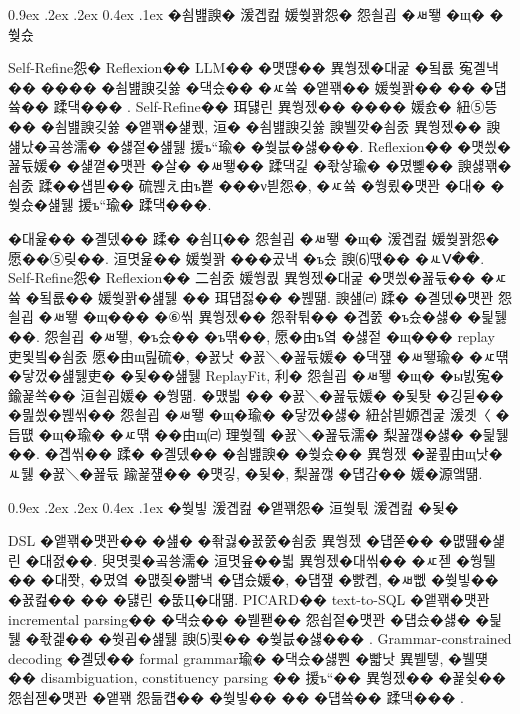 \documentclass[10pt,twocolumn]{article}
\makeatletter
\renewcommand{\subsection}{\@startsection{subsection}{2}{\z@}%
{0.9ex \@plus .2ex \@minus .2ex}%
{0.4ex \@plus .1ex}%
{\normalfont\normalsize\bfseries}}
\makeatother
\begin{document}
\subsection{�쇰뱶諛� 湲곕컲 媛쒖꽑怨� 怨쇨굅 �ㅽ뙣 �щ� �쒖슜}

Self-Refine怨� Reflexion�� LLM�� �먯떊�� 異쒕젰�대굹 �됰룞 寃곌낵�� ���� �쇰뱶諛깆쓣 �댁슜�� �ㅼ쓬 �앹꽦�� 媛쒖꽑�� �� �덉쓬�� 蹂댁��� \cite{REF_SELFREFINE,REF_REFLEXION}. Self-Refine�� 珥덇린 異쒕젰�� ���� 媛숈� 紐⑤뜽�� �쇰뱶諛깆쓣 �앹꽦�섍퀬, 洹� �쇰뱶諛깆쓣 諛뷀깢�쇰줈 異쒕젰�� 諛섎났�곸쑝濡� �섏젙�섎뒗 援ъ“瑜� �쒖븞�섏���. Reflexion�� �먯씠�꾪듃媛� �섍꼍�먯꽌 �살� �ㅽ뙣�� 蹂댁긽 �좏샇瑜� �몄뼱�� 諛섏꽦�쇰줈 蹂��섑븯�� 硫붾え由ъ뿉 ���ν븯怨�, �ㅼ쓬 �쒕룄�먯꽌 �대� �쒖슜�섎뒗 援ъ“瑜� 蹂댁���.

�대윭�� �곌뎄�� 蹂� �쇰Ц�� 怨쇨굅 �ㅽ뙣 �щ� 湲곕컲 媛쒖꽑怨� 愿��⑤맂��. 洹몃윭�� 媛쒖꽑 ���곴낵 �ъ슜 諛⑹떇�� �ㅻⅤ��. Self-Refine怨� Reflexion�� 二쇰줈 媛쒕퀎 異쒕젰�대굹 �먯씠�꾪듃�� �ㅼ쓬 �됰룞�� 媛쒖꽑�섎뒗 �� 珥덉젏�� �붾떎. 諛섎㈃ 蹂� �곌뎄�먯꽌 怨쇨굅 �ㅽ뙣 �щ��� �⑥씪 異쒕젰�� 怨좎튂�� �곕쭔 �ъ슜�섏� �딅뒗��. 怨쇨굅 �ㅽ뙣, �ъ슜�� �ъ떆��, 愿�由ъ옄 �섏젙 �щ��� replay 吏묓빀�쇰줈 愿�由щ릺硫�, �꾨낫 �꾨＼�꾪듃媛� �댁쟾 �ㅽ뙣瑜� �ㅼ떆 �닿껐�섎뒗吏� �됯��섎뒗 ReplayFit, 利� 怨쇨굅 �ㅽ뙣 �щ� �ы빐寃� 鍮꾩쑉�� 洹쇨굅媛� �쒕떎. �먰븳 �� �꾨＼�꾪듃媛� �됯퇏 �깅뒫�� �믪씠�붾씪�� 怨쇨굅 �ㅽ뙣 �щ�瑜� �닿껐�섏� 紐삵븯嫄곕굹 湲곗〈 �듭떖 �щ�瑜� �ㅼ떆 ��由щ㈃ 理쒖쥌 �꾨＼�꾪듃濡� 梨꾪깮�섏� �딅뒗��. �곕씪�� 蹂� �곌뎄�� �쇰뱶諛� �쒖슜�� 異쒕젰 �꾩쿂由щ낫�ㅻ뒗 �꾨＼�꾪듃 踰꾩쟾�� �먯깋, �됯�, 梨꾪깮 �덉감�� 媛�源앸떎.

\subsection{�쒖빟 湲곕컲 �앹꽦怨� 洹쒖튃 湲곕컲 �됯�}

DSL �앹꽦�먯꽌�� �섎� �좎궗�꾨쭔�쇰줈 異쒕젰 �덉쭏�� �먮떒�섍린 �대졄��. 臾몃쾿�곸쑝濡� 洹몃윺��븳 異쒕젰�대씪�� �ㅼ젣 �쒕퉬�� �대쫫, �몄옄 �먮즺�뺢낵 �덉슜媛�, �덉쟾 �뺤콉, �ㅽ뻾 �쒖빟�� �꾨컲�� �� �덇린 �뚮Ц�대떎. PICARD�� text-to-SQL �앹꽦�먯꽌 incremental parsing�� �댁슜�� �붿퐫�� 怨쇱젙�먯꽌 �덉슜�섏� �딅뒗 �좏겙�� �쒓굅�섎뒗 諛⑸쾿�� �쒖븞�섏��� \cite{REF_PICARD}. Grammar-constrained decoding �곌뎄�� formal grammar瑜� �댁슜�섏뿬 �뺣낫 異붿텧, �뷀떚�� disambiguation, constituency parsing �� 援ъ“�� 異쒕젰�� �꾩슂�� 怨쇱젣�먯꽌 �앹꽦 怨듦컙�� �쒖빟�� �� �덉쓬�� 蹂댁��� \cite{REF_GRAMMAR}.
\end{document}
